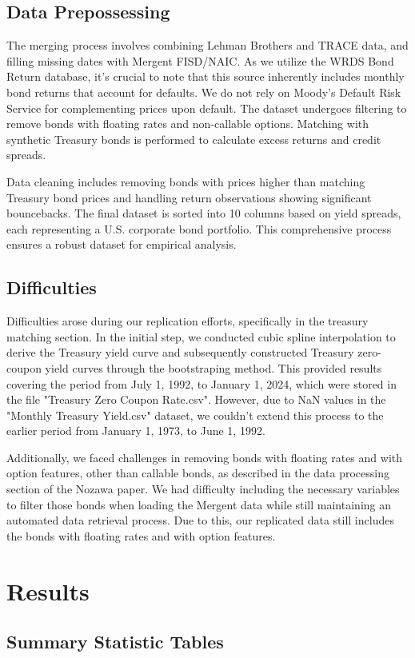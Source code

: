 \documentclass{article}
\begin{document}
\subsection{Data Prepossessing}

The merging process involves combining Lehman Brothers and TRACE data, and filling missing dates with Mergent FISD/NAIC.  As we utilize the WRDS Bond Return database, it's crucial to note that this source inherently includes monthly bond returns that account for defaults. We do not rely on Moody's Default Risk Service for complementing prices upon default. The dataset undergoes filtering to remove bonds with floating rates and non-callable options. Matching with synthetic Treasury bonds is performed to calculate excess returns and credit spreads. 

Data cleaning includes removing bonds with prices higher than matching Treasury bond prices and handling return observations showing significant bouncebacks. The final dataset is sorted into 10 columns based on yield spreads, each representing a U.S. corporate bond portfolio. This comprehensive process ensures a robust dataset for empirical analysis. 

\subsection{Difficulties}

Difficulties arose during our replication efforts, specifically in the treasury matching section. In the initial step, we conducted cubic spline interpolation to derive the Treasury yield curve and subsequently constructed Treasury zero-coupon yield curves through the bootstraping method. This provided results covering the period from July 1, 1992, to January 1, 2024, which were stored in the file "Treasury Zero Coupon Rate.csv". However, due to NaN values in the "Monthly Treasury Yield.csv" dataset, we couldn't extend this process to the earlier period from January 1, 1973, to June 1, 1992. 

Additionally, we faced challenges in removing bonds with floating rates and with option features, other than callable bonds, as described in the data processing section of the Nozawa paper. We had difficulty including the necessary variables to filter those bonds when loading the Mergent data while still maintaining an automated data retrieval process. Due to this, our replicated data still includes the bonds with floating rates and with option features. 

\section{ Results}

\subsection{Summary Statistic Tables}




\end{document}
